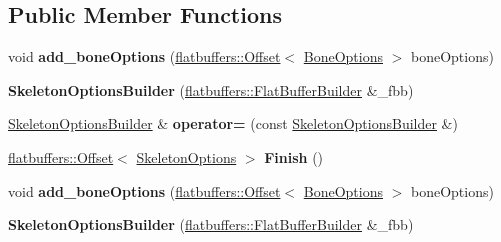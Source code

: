 \subsection*{Public Member Functions}
\begin{DoxyCompactItemize}
\item 
\mbox{\label{structflatbuffers_1_1SkeletonOptionsBuilder_ac4e17ac2c4e7cbe376a22d59c4082bf4}} 
void {\bfseries add\+\_\+bone\+Options} (\hyperlink{structflatbuffers_1_1Offset}{flatbuffers\+::\+Offset}$<$ \hyperlink{structflatbuffers_1_1BoneOptions}{Bone\+Options} $>$ bone\+Options)
\item 
\mbox{\label{structflatbuffers_1_1SkeletonOptionsBuilder_abc38caea8f7b1aac887eb85fef0584aa}} 
{\bfseries Skeleton\+Options\+Builder} (\hyperlink{classflatbuffers_1_1FlatBufferBuilder}{flatbuffers\+::\+Flat\+Buffer\+Builder} \&\+\_\+fbb)
\item 
\mbox{\label{structflatbuffers_1_1SkeletonOptionsBuilder_a108bda6f6857114c5686392b52740693}} 
\hyperlink{structflatbuffers_1_1SkeletonOptionsBuilder}{Skeleton\+Options\+Builder} \& {\bfseries operator=} (const \hyperlink{structflatbuffers_1_1SkeletonOptionsBuilder}{Skeleton\+Options\+Builder} \&)
\item 
\mbox{\label{structflatbuffers_1_1SkeletonOptionsBuilder_a5924f621a5c7e9642285ab0d90fcb9bd}} 
\hyperlink{structflatbuffers_1_1Offset}{flatbuffers\+::\+Offset}$<$ \hyperlink{structflatbuffers_1_1SkeletonOptions}{Skeleton\+Options} $>$ {\bfseries Finish} ()
\item 
\mbox{\label{structflatbuffers_1_1SkeletonOptionsBuilder_ac4e17ac2c4e7cbe376a22d59c4082bf4}} 
void {\bfseries add\+\_\+bone\+Options} (\hyperlink{structflatbuffers_1_1Offset}{flatbuffers\+::\+Offset}$<$ \hyperlink{structflatbuffers_1_1BoneOptions}{Bone\+Options} $>$ bone\+Options)
\item 
\mbox{\label{structflatbuffers_1_1SkeletonOptionsBuilder_abc38caea8f7b1aac887eb85fef0584aa}} 
{\bfseries Skeleton\+Options\+Builder} (\hyperlink{classflatbuffers_1_1FlatBufferBuilder}{flatbuffers\+::\+Flat\+Buffer\+Builder} \&\+\_\+fbb)

\end{DoxyCompactItemize}

